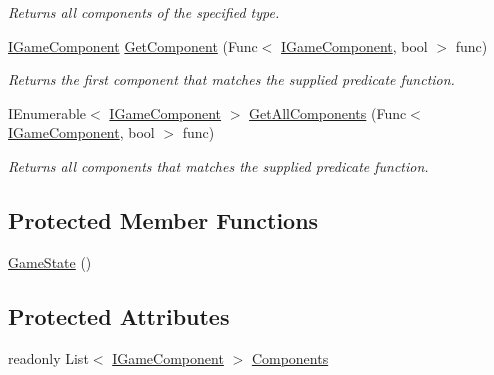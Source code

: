 \begin{DoxyCompactItemize}
\begin{DoxyCompactList}\small\item\em Returns all components of the specified type. \end{DoxyCompactList}\item 
\hyperlink{interface_tri_devs_1_1_tri_engine_1_1_interfaces_1_1_i_game_component}{I\-Game\-Component} \hyperlink{class_tri_devs_1_1_tri_engine_1_1_state_management_1_1_game_state_a50421aba016be54ecfd7f98dc5662a1e}{Get\-Component} (Func$<$ \hyperlink{interface_tri_devs_1_1_tri_engine_1_1_interfaces_1_1_i_game_component}{I\-Game\-Component}, bool $>$ func)
\begin{DoxyCompactList}\small\item\em Returns the first component that matches the supplied predicate function. \end{DoxyCompactList}\item 
I\-Enumerable$<$ \hyperlink{interface_tri_devs_1_1_tri_engine_1_1_interfaces_1_1_i_game_component}{I\-Game\-Component} $>$ \hyperlink{class_tri_devs_1_1_tri_engine_1_1_state_management_1_1_game_state_a56cd48d8ad276076c078672e04785a60}{Get\-All\-Components} (Func$<$ \hyperlink{interface_tri_devs_1_1_tri_engine_1_1_interfaces_1_1_i_game_component}{I\-Game\-Component}, bool $>$ func)
\begin{DoxyCompactList}\small\item\em Returns all components that matches the supplied predicate function. \end{DoxyCompactList}\end{DoxyCompactItemize}
\subsection*{Protected Member Functions}
\begin{DoxyCompactItemize}
\item 
\hyperlink{class_tri_devs_1_1_tri_engine_1_1_state_management_1_1_game_state_a1cc8a45df72a35ad1d55187faacd6f27}{Game\-State} ()
\end{DoxyCompactItemize}
\subsection*{Protected Attributes}
\begin{DoxyCompactItemize}
\item 
readonly List$<$ \hyperlink{interface_tri_devs_1_1_tri_engine_1_1_interfaces_1_1_i_game_component}{I\-Game\-Component} $>$ \hyperlink{class_tri_devs_1_1_tri_engine_1_1_state_management_1_1_game_state_a0e38f881a0d0082c2e92f1441c08abb6}{Components}
\end{DoxyCompactItemize}
